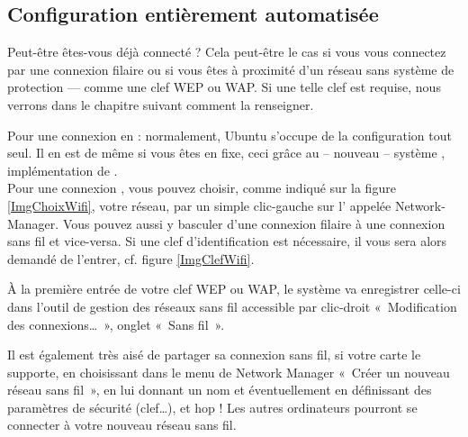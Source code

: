 \subsection{Configuration entièrement automatisée}
\label{RefUtilisationNM}
Peut-être êtes-vous déjà connecté ? Cela peut-être le cas si vous vous connectez par une connexion filaire ou si vous êtes à proximité d'un réseau  sans système de protection --- comme une clef WEP ou WAP. Si une telle clef est requise, nous verrons dans le chapitre suivant comment la renseigner.\par
Pour une connexion  en  : normalement, Ubuntu s'occupe de la configuration tout seul. Il en est de même si vous êtes en  fixe, ceci grâce au -- nouveau -- système , implémentation de .\\
Pour une connexion , vous pouvez choisir, comme indiqué sur la figure \ref{ImgChoixWifi}, votre réseau, par un simple clic-gauche sur l' appelée Network-Manager. Vous pouvez aussi y basculer d'une connexion filaire à une connexion sans fil et vice-versa. Si une clef d'identification est nécessaire, il vous sera alors demandé de l'entrer, cf. figure \ref{ImgClefWifi}.\par
À la première entrée de votre clef WEP ou WAP, le système va enregistrer celle-ci dans l'outil de gestion des réseaux sans fil accessible par clic-droit «~Modification des connexions\ldots{}~», onglet «~Sans fil~».\par
\ReseauNM
Il est également très aisé de partager sa connexion sans fil, si votre carte  le supporte, en choisissant dans le menu de Network Manager «~Créer un nouveau réseau sans fil~», en lui donnant un nom et éventuellement en définissant des paramètres de sécurité (clef\ldots{}), et hop ! Les autres ordinateurs pourront se connecter à votre nouveau réseau sans fil.
